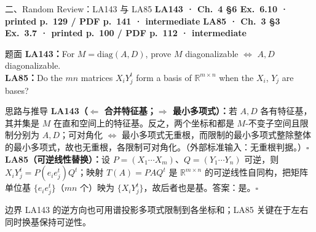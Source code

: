 \documentclass[aspectratio=169,10pt,fontset=none]{ctexbeamer}
\newcommand{\ex}[1]{\textcolor{accent}{\footnotesize\bfseries #1}}
\begin{document}
\begin{frame}[t]{二、Random Review：LA143 与 LA85}
  \leavevmode\ex{LA143 · Ch.~4 §6 Ex.~6.10 · printed p.~129 / PDF p.~141 · intermediate}\quad
  \ex{LA85 · Ch.~3 §3 Ex.~3.7 · printed p.~100 / PDF p.~112 · intermediate}
  \begin{block}{\footnotesize 题面}
    \scriptsize \textbf{LA143：}For $M=\mathrm{diag}(A,D)$, prove $M$ diagonalizable $\iff$ $A,D$ diagonalizable.\\
    \textbf{LA85：}Do the $mn$ matrices $X_iY_j^t$ form a basis of $\mathbb R^{m\times n}$ when the $X_i$, $Y_j$ are bases?
  \end{block}
  \begin{exampleblock}{\footnotesize 思路与推导}
    \scriptsize
    \textbf{LA143（$\Leftarrow$ 合并特征基；$\Rightarrow$ 最小多项式）：}若 $A,D$ 各有特征基，其并集是 $M$ 在直和空间上的特征基。反之，两个坐标和都是 $M$-不变子空间且限制分别为 $A,D$；可对角化 $\iff$ 最小多项式无重根，而限制的最小多项式整除整体的最小多项式，故也无重根，各限制可对角化。（外部标准输入：无重根判据。）$\square$\\[2pt]
    \textbf{LA85（可逆线性替换）：}设 $P=(X_1\cdots X_m)$、$Q=(Y_1\cdots Y_n)$ 可逆，则 $X_iY_j^t=P(e_ie_j^t)Q^t$；映射 $T(A)=PAQ^t$ 是 $\mathbb R^{m\times n}$ 的可逆线性自同构，把矩阵单位基 $\{e_ie_j^t\}$（$mn$ 个）映为 $\{X_iY_j^t\}$，故后者也是基。答案：是。$\square$
  \end{exampleblock}
  \begin{block}{\footnotesize 边界}
    \scriptsize LA143 的逆方向也可用谱投影多项式限制到各坐标和；LA85 关键在于左右同时换基保持可逆性。
  \end{block}
\end{frame}
\end{document}
